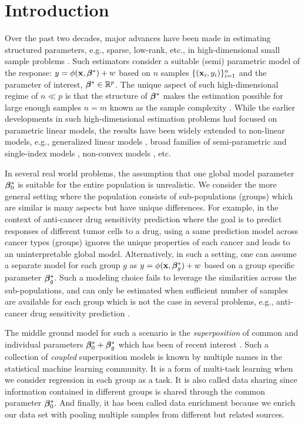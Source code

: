 \section{Introduction}
Over the past two decades, major advances have been made in estimating structured parameters, e.g., sparse, low-rank, etc., in high-dimensional small sample problems \cite{candes2010power, donoho2006compressed, friedman2008sparse}. Such estimators consider a suitable (semi) parametric model of the response: $y = \phi(\mathbf{x},\boldsymbol{\beta}^*) + w$ based on $n$ samples $\{(\mathbf{x}_i,y_i)\}_{i=1}^n$ and the parameter of interest, $\boldsymbol{\beta}^* \in \mathbb R^p$. The unique aspect of such high-dimensional regime of $n \ll p$ is that the structure of $\boldsymbol{\beta}^*$ makes
the estimation possible for large enough samples $n = m$ known as the sample complexity \cite{candes2009exact, candes2006robust, tibshirani1996regression}. While the earlier developments in such high-dimensional estimation problems had focused on parametric linear models, the results have been widely extended to non-linear models, e.g., generalized linear models \cite{bach2012optimization, negahban2009unified}, broad families of semi-parametric and single-index models \cite{boufounos20081, plan2017high}, non-convex models \cite{blumensath2009iterative,jain2013low}, etc.

In several real world problems, the assumption that one global model parameter $\boldsymbol{\beta}_0^*$ is suitable for the entire population is unrealistic.
We consider the more general setting where the population consists of sub-populations (groups) which are similar is many aspects but have unique differences. For example, in the context of anti-cancer drug sensitivity prediction where the goal is to predict responses of different tumor cells to a drug, using a same prediction model across cancer types (groups) ignores the unique properties of each cancer and leads to an uninterpretable global model. Alternatively, in such a setting, one can assume a separate model for each group $g$ as $y = \phi(\mathbf{x}, \boldsymbol{\beta}_g^*) + w$ based on a group specific parameter $\boldsymbol{\beta}^*_g$. Such a modeling choice fails to leverage the similarities across the sub-populations, and can only be estimated when sufficient number of samples are available for each group which is not the case in several problems, e.g., anti-cancer drug sensitivity prediction \cite{barretina2012cancer, iorio2016landscape1}.

The middle ground model for such a scenario is the \emph{superposition} of common and individual parameters $\boldsymbol{\beta}_0^* + \boldsymbol{\beta}_g^*$ which has been of recent interest \cite{??, guba16}. Such a collection of \emph{coupled} superposition models is known by multiple names in the statistical machine learning community. It is a form of multi-task learning \cite{jrsr10, Zhang2017-rm} when we consider regression in each group as a task. It is also called data sharing \cite{grti16} since information contained in different groups is shared through the common parameter $\boldsymbol{\beta}_0^*$. And finally, it has been called data enrichment \cite{Chen2015-fj} because we enrich our data set with pooling multiple samples from different but related sources. 

